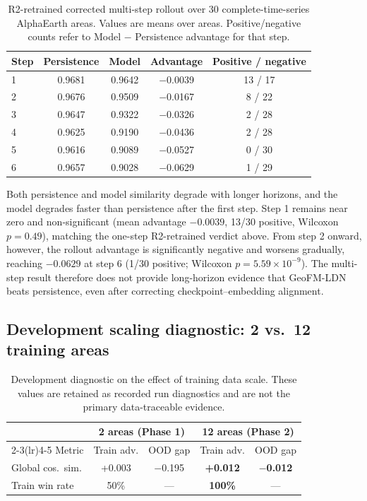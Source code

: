 \documentclass{article}
\begin{document}
\begin{table}[htbp]
\centering
\caption{R2-retrained corrected multi-step rollout over 30 complete-time-series AlphaEarth areas. Values are means over areas. Positive/negative counts refer to Model $-$ Persistence advantage for that step.}
\label{tab:multistep}
\small
\begin{tabular}{lcccc}
\toprule
Step & Persistence & Model & Advantage & Positive / negative \\
\midrule
1 & 0.9681 & 0.9642 & $-$0.0039 & 13 / 17 \\
2 & 0.9676 & 0.9509 & $-$0.0167 & 8 / 22 \\
3 & 0.9647 & 0.9322 & $-$0.0326 & 2 / 28 \\
4 & 0.9625 & 0.9190 & $-$0.0436 & 2 / 28 \\
5 & 0.9616 & 0.9089 & $-$0.0527 & 0 / 30 \\
6 & 0.9657 & 0.9028 & $-$0.0629 & 1 / 29 \\
\bottomrule
\end{tabular}
\end{table}

Both persistence and model similarity degrade with longer horizons, and the model degrades faster than persistence after the first step. Step 1 remains near zero and non-significant (mean advantage $-0.0039$, 13/30 positive, Wilcoxon $p=0.49$), matching the one-step R2-retrained verdict above. From step 2 onward, however, the rollout advantage is significantly negative and worsens gradually, reaching $-0.0629$ at step 6 (1/30 positive; Wilcoxon $p=5.59\times10^{-9}$). The multi-step result therefore does not provide long-horizon evidence that GeoFM-LDN beats persistence, even after correcting checkpoint--embedding alignment.

\subsection{Development scaling diagnostic: 2 vs.~12 training areas}
\label{sec:ablation_data}

\begin{table}[htbp]
\centering
\caption{Development diagnostic on the effect of training data scale. These values are retained as recorded run diagnostics and are not the primary data-traceable evidence.}
\label{tab:scaling}
\begin{tabular}{lcccc}
\toprule
 & \multicolumn{2}{c}{2 areas (Phase 1)} & \multicolumn{2}{c}{12 areas (Phase 2)} \\
\cmidrule(lr){2-3}\cmidrule(lr){4-5}
Metric & Train adv. & OOD gap & Train adv. & OOD gap \\
\midrule
Global cos.~sim. & +0.003 & $-$0.195 & \textbf{+0.012} & $\mathbf{-}$\textbf{0.012} \\
Train win rate & 50\% & --- & \textbf{100\%} & --- \\
\bottomrule
\end{tabular}
\end{table}
\end{document}

